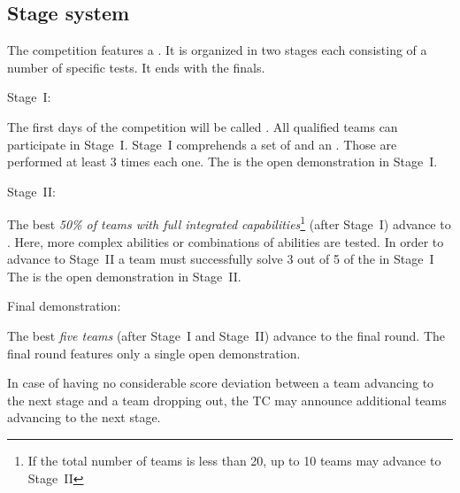 \subsection{Stage system}\label{rule:stages}

The competition features a . 
It is organized in two stages each consisting of a number of specific tests. 
It ends with the finals.

\begin{enumerate}
{\bf\item Stage~I:} The first days of the competition will be called . 
  All qualified teams can participate in Stage~I.
  Stage~I comprehends a set of  and an . Those  are performed at least 3 times each one.
  The  is the open demonstration in Stage~I.

{\bf\item Stage~II:} The best \emph{50\% of teams with full integrated capabilities}\footnote{If the total number of teams is less than 20, up to 10 teams may advance to Stage~II} (after Stage~I) advance to . 
  Here, more complex abilities or combinations of abilities are tested. 
  In order to advance to Stage~II a team must successfully solve 3 out of 5 of the  in Stage~I
  The  is the open demonstration in Stage~II.
{\bf\item Final demonstration:} The best \emph{five teams} (after Stage~I and Stage~II) advance to the final round. 
  The final round features only a single open demonstration.
\end{enumerate}
In case of having no considerable score deviation between a team advancing to the next stage and a team dropping out, the TC may announce additional teams advancing to the next stage.


